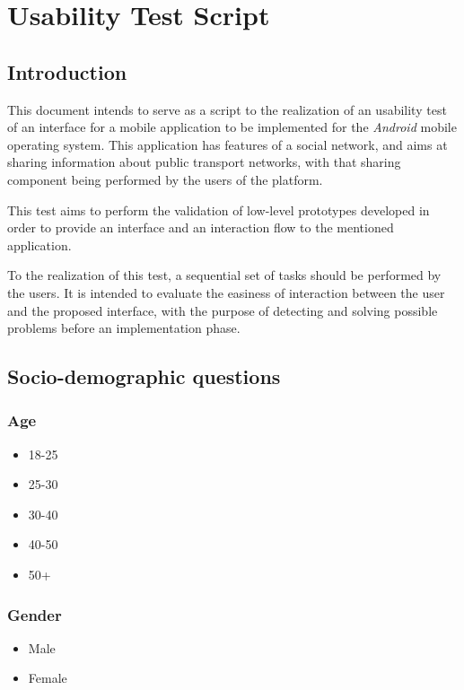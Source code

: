 \chapter{Usability Test Script} \label{ap2:usabtest}

\section{Introduction}

This document intends to serve as a script to the realization of an usability test of an interface for a mobile application to be implemented for the \emph{Android} mobile operating system.
This application has features of a social network, and aims at sharing information about public transport networks, with that sharing component being performed by the users of the platform.

This test aims to perform the validation of low-level prototypes developed in order to provide an interface and an interaction flow to the mentioned application.

To the realization of this test, a sequential set of tasks should be performed by the users. It is intended to evaluate the easiness of interaction between the user and the proposed interface, with the purpose of detecting and solving possible problems before an implementation phase.

\section{Socio-demographic questions}

\subsection{Age}
\begin{itemize}
\item 18-25
\item 25-30
\item 30-40
\item 40-50
\item 50+
\end{itemize}

\subsection{Gender}
\begin{itemize}
\item Male
\item Female
\end{itemize}

